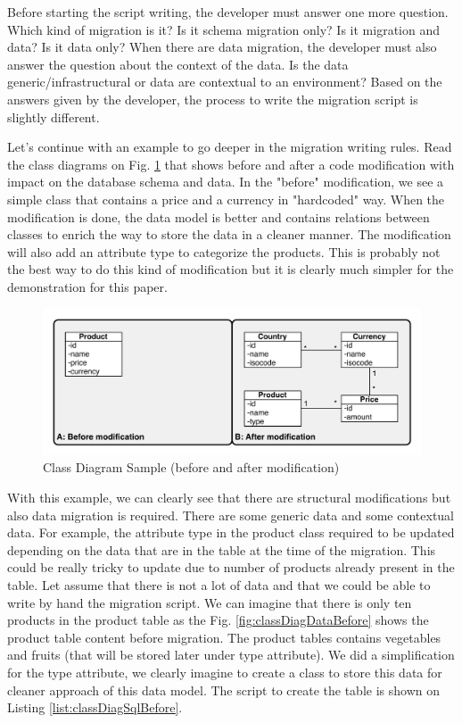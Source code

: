 Before starting the script writing, the developer must answer one more question. Which kind of migration is it? Is it schema migration only? Is it migration and data? Is it data only? When there are data migration, the developer must also answer the question about the context of the data. Is the data generic/infrastructural or data are contextual to an environment? Based on the answers given by the developer, the process to write the migration script is slightly different.

Let's continue with an example to go deeper in the migration writing rules. Read the class diagrams on Fig. \ref{fig:classDiagSample} that shows before and after a code modification with impact on the database schema and data. In the "before" modification, we see a simple class that contains a price and a currency in "hardcoded" way. When the modification is done, the data model is better and contains relations between classes to enrich the way to store the data in a cleaner manner. The modification will also add an attribute type to categorize the products. This is probably not the best way to do this kind of modification but it is clearly much simpler for the demonstration for this paper.

\begin{figure}[h]
        \centering
        \includegraphics[scale=0.60]{images/ClassDiagramSample.pdf}
        \caption{Class Diagram Sample (before and after modification)}
        \label{fig:classDiagSample}
\end{figure}

With this example, we can clearly see that there are structural modifications but also data migration is required. There are some generic data and some contextual data. For example, the attribute type in the product class required to be updated depending on the data that are in the table at the time of the migration. This could be really tricky to update due to number of products already present in the table. Let assume that there is not a lot of data and that we could be able to write by hand the migration script. We can imagine that there is only ten products in the product table as the Fig. \ref{fig:classDiagDataBefore} shows the product table content before migration. The product tables contains vegetables and fruits (that will be stored later under type attribute). We did a simplification for the type attribute, we clearly imagine to create a class to store this data for cleaner approach of this data model. The script to create the table is shown on Listing \ref{list:classDiagSqlBefore}.

